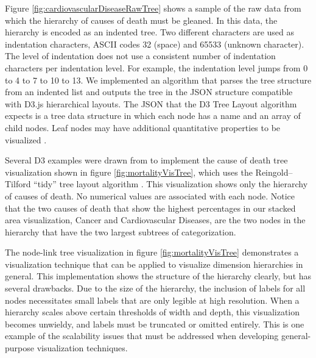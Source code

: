 Figure \ref{fig:cardiovascularDiseaseRawTree} shows a sample of the raw data from which the hierarchy of causes of death must be gleaned. In this data, the hierarchy is encoded as an indented tree. Two different characters are used as indentation characters, ASCII codes 32 (space) and 65533 (unknown character). The level of indentation does not use a consistent number of indentation characters per indentation level. For example, the indentation level jumps from 0 to 4 to 7 to 10 to 13. We implemented an algorithm that parses the tree structure from an indented list and outputs the tree in the JSON structure compatible with D3.js hierarchical layouts. The JSON that the D3 Tree Layout algorithm expects is a tree data structure in which each node has a name and an array of child nodes. Leaf nodes may have additional quantitative properties to be visualized \cite{d3TreeLayout}.

Several D3 examples were drawn from to implement the cause of death tree visualization shown in figure \ref{fig:mortalityVisTree}, which uses the Reingold–Tilford ``tidy'' tree layout algorithm \cite{reingold1981tidier}. This visualization shows only the hierarchy of causes of death. No numerical values are associated with each node. Notice that the two causes of death that show the highest percentages in our stacked area visualization, Cancer and Cardiovascular Diseases, are the two nodes in the hierarchy that have the two largest subtrees of categorization.

The node-link tree visualization in figure \ref{fig:mortalityVisTree} demonstrates a visualization technique that can be applied to visualize dimension hierarchies in general. This implementation shows the structure of the hierarchy clearly, but has several drawbacks. Due to the size of the hierarchy, the inclusion of labels for all nodes necessitates small labels that are only legible at high resolution. When a hierarchy scales above certain thresholds of width and depth, this visualization becomes unwieldy, and labels must be truncated or omitted entirely. This is one example of the scalability issues that must be addressed when developing general-purpose visualization techniques.

